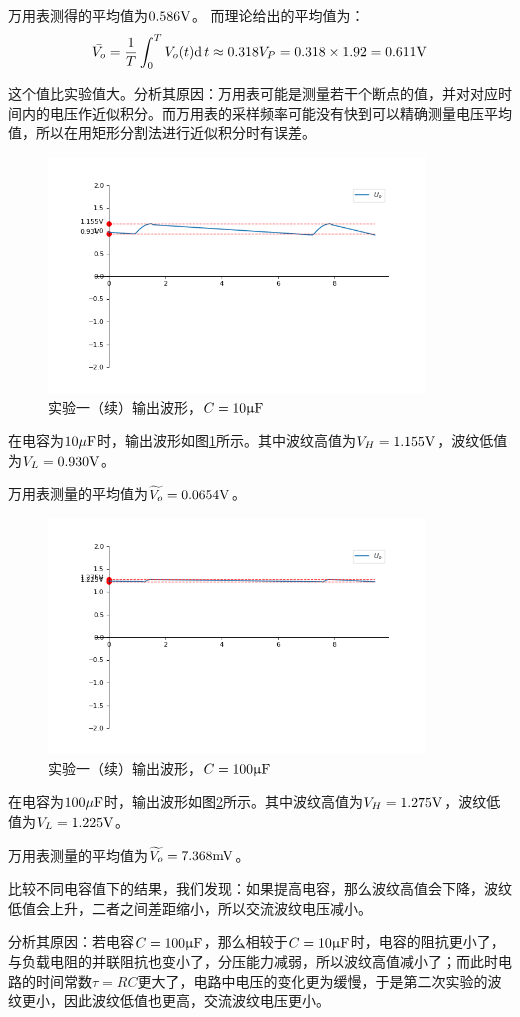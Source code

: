 \documentclass[a4paper,11pt,UTF8]{ctexart}
\begin{document}
	\par 万用表测得的平均值为$0.586\mathrm{V}$。
	而理论给出的平均值为：
	\[ \bar{V_o}=\frac{1}{T}\int_0^TV_o(t)\mathrm{d\,}{t}\approx0.318V_P=0.318\times1.92=0.611\mathrm{V} \]
	\par 这个值比实验值大。分析其原因：万用表可能是测量若干个断点的值，并对对应时间内的电压作近似积分。而万用表的采样频率可能没有快到可以精确测量电压平均值，所以在用矩形分割法进行近似积分时有误差。
	\begin{figure}[H]
		\centering
		\includegraphics[width=10cm]{U2.png}
		\caption{实验一（续）输出波形，$C=10\mathrm{\upmu F}$}
		\label{fig:Exp1Cono1}
	\end{figure}
	在电容为$10\mathrm{\mu F}$时，输出波形如图\ref{fig:Exp1Cono1}所示。其中波纹高值为$V_H=1.155\mathrm{V}$，波纹低值为$V_L=0.930\mathrm{V}$。
	\par 万用表测量的平均值为$\widetilde{V_o}=0.0654\mathrm{V}$。
	\begin{figure}[H]
		\centering
		\includegraphics[width=10cm]{U3.png}
		\caption{实验一（续）输出波形，$C=100\mathrm{\upmu F}$}
		\label{fig:Exp1Cono2}
	\end{figure}
	在电容为$100\mathrm{\mu F}$时，输出波形如图\ref{fig:Exp1Cono2}所示。其中波纹高值为$V_H=1.275\mathrm{V}$，波纹低值为$V_L=1.225\mathrm{V}$。
	\par 万用表测量的平均值为$\widetilde{V_o}=7.368\mathrm{mV}$。
	\par 比较不同电容值下的结果，我们发现：如果提高电容，那么波纹高值会下降，波纹低值会上升，二者之间差距缩小，所以交流波纹电压减小。
	\par 分析其原因：若电容$C=100\mathrm{\upmu F}$，那么相较于$C=10\mathrm{\upmu F}$时，电容的阻抗更小了，与负载电阻的并联阻抗也变小了，分压能力减弱，所以波纹高值减小了；而此时电路的时间常数$\tau=RC$更大了，电路中电压的变化更为缓慢，于是第二次实验的波纹更小，因此波纹低值也更高，交流波纹电压更小。
\end{document}
